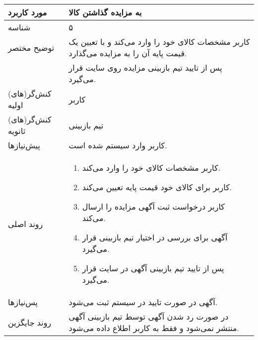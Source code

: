 \documentclass{article}
\begin{document}
\begin{center}
\bgroup
\def\arraystretch{1.5}
\begin{tabular} {|p{}|p{}|}
\hline
 مورد کاربرد & 
 به مزایده گذاشتن کالا
\\ \hline
 شناسه &
۵
\\ \hline
توضیح مختصر &
کاربر مشخصات کالای خود را وارد می‌کند و با تعیین یک قیمت پایه آن را به مزایده می‌گذارد.
\\
&
پس از تایید تیم بازبینی مزایده روی سایت قرار می‌گیرد.
\\ \hline
کنش‌گر(های) اولیه &
کاربر
\\ \hline
کنش‌گر(های) ثانویه &
تیم بازبینی
\\ \hline
پیش‌نیازها &
کاربر وارد سیستم شده است.
\\ \hline
روند اصلی &
\begin{enumerate}
\item
کاربر مشخصات کالای خود را وارد می‌کند.
\item
کاربر برای کالای خود قیمت پایه تعیین می‌کند.
\item
کاربر درخواست ثبت آگهی مزایده را ارسال می‌کند.
\item
آگهی برای بررسی در اختیار تیم بازبینی قرار می‌گیرد.
\item
پس از تایید تیم بازبینی آگهی در سایت قرار می‌گیرد.
\end{enumerate}
\\ \hline
پس‌نیازها &
آگهی در صورت تایید در سیستم ثبت می‌شود.
\\ \hline
روند جایگزین &
در صورت رد شدن آگهی توسط تیم بازبینی آگهی منتشر نمی‌شود و فقط به کاربر اطلاع داده می‌شود. 
\\ \hline
\end{tabular}
\egroup
\end{center}

\newpage
\end{document}
